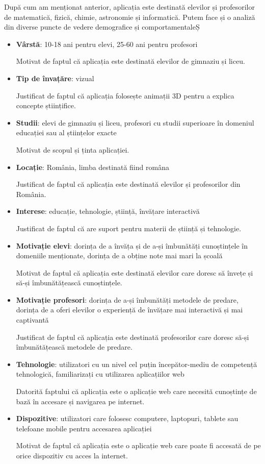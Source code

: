 După cum am menționat anterior, aplicația este destinată elevilor și profesorilor de matematică, fizică, chimie, astronomie și informatică.
Putem face și o analiză din diverse puncte de vedere demografice și comportamentaleȘ
\begin{itemize}
    \item \textbf{Vârstă}: 10-18 ani pentru elevi, 25-60 ani pentru profesori

    Motivat de faptul că aplicația este destinată elevilor de gimnaziu și liceu.
    \item \textbf{Tip de învațăre}: vizual

    Justificat de faptul că aplicația folosește animații 3D pentru a explica concepte științifice.
    \item \textbf{Studii}: elevi de gimnaziu și liceu, profesori cu studii superioare în domeniul educației sau al științelor exacte
    
    Motivat de scopul și ținta aplicației.
    \item \textbf{Locație}: România, limba destinată fiind româna

    Justificat de faptul că aplicația este destinată elevilor și profesorilor din România.
    \item \textbf{Interese}: educație, tehnologie, știință, învățare interactivă
    
    Justificat de faptul că are suport pentru materii de știință și tehnologie.
    \item \textbf{Motivație elevi}: dorința de a învăța și de a-și îmbunătăți cunoștințele în domeniile menționate, dorința de a obține note mai mari la școală
    
    Motivat de faptul că aplicația este destinată elevilor care doresc să învețe și să-și îmbunătățească cunoștințele.
    \item \textbf{Motivație profesori}: dorința de a-și îmbunătăți metodele de predare, dorința de a oferi elevilor o experiență de 
    învățare mai interactivă și mai captivantă

    Justificat de faptul că aplicația este destinată profesorilor care doresc să-și îmbunătățească metodele de predare.
    \item \textbf{Tehnologie}: utilizatori cu un nivel cel puțin începător-mediu de competență tehnologică, familiarizați cu utilizarea aplicațiilor web
    
    Datorită faptului că aplicația este o aplicație web care necesită cunoștințe de bază în accesare și navigarea pe internet.
    \item \textbf{Dispozitive}: utilizatori care folosesc computere, laptopuri, tablete sau telefoane mobile pentru accesarea aplicației
    
    Motivat de faptul că aplicația este o aplicație web care poate fi accesată de pe orice dispozitiv cu acces la internet.
\end{itemize}

